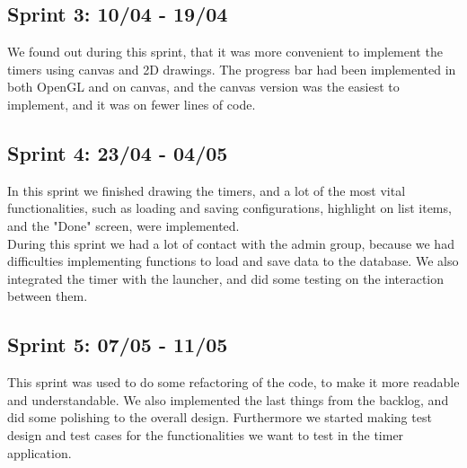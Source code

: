 \subsection*{Sprint 3: 10/04 - 19/04}
We found out during this sprint, that it was more convenient to implement the timers using canvas and 2D drawings. The progress bar had been implemented in both OpenGL and on canvas, and the canvas version was the easiest to implement, and it was on fewer lines of code.	

\subsection*{Sprint 4: 23/04 - 04/05}
In this sprint we finished drawing the timers, and a lot of the most vital functionalities, such as loading and saving configurations, highlight on list items, and the "Done" screen, were implemented.\\
	During this sprint we had a lot of contact with the admin group, because we had difficulties implementing functions to load and save data to the database. We also integrated the timer with the launcher, and did some testing on the interaction between them.

\subsection*{Sprint 5: 07/05 - 11/05} 
This sprint was used to do some refactoring of the code, to make it more readable and understandable. We also implemented the last things from the backlog, and did some polishing to the overall design. Furthermore we started making test design and test cases for the functionalities we want to test in the timer application.

